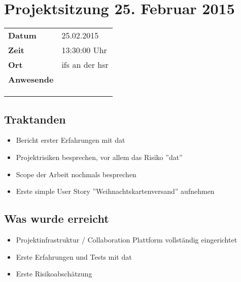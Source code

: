 \documentclass[class=scrbook,crop=false]{standalone}
\begin{document}
	
	\section{Projektsitzung 25. Februar 2015}
	
	\begin{tabular}{ll}
		\textbf{Datum} & 25.02.2015 \\
		\textbf{Zeit} & 13:30\textendash15:00 Uhr \\
		\textbf{Ort} & \acs{ifs} an der \acs{hsr} \\
		\textbf{Anwesende} & \proff \\ & \chuf \\ & \rlif \\ & \fscf
	\end{tabular}
	
	\subsection*{Traktanden}
	\begin{itemize}
		\item Bericht erster Erfahrungen mit \gls{dat}
		\item Projektrisiken besprechen, vor allem das Risiko ''\gls{dat}''
		\item Scope der Arbeit nochmals besprechen
		\item Erste simple User Story ''Weihnachtskartenversand'' aufnehmen
	\end{itemize}
	
	\subsection*{Was wurde erreicht}
	\begin{itemize}
		\item Projektinfrastruktur / Collaboration Plattform vollständig eingerichtet
		\item Erste Erfahrungen und Tests mit \gls{dat}
		\item Erste Risikoabschätzung
	\end{itemize}
	
\end{document}
